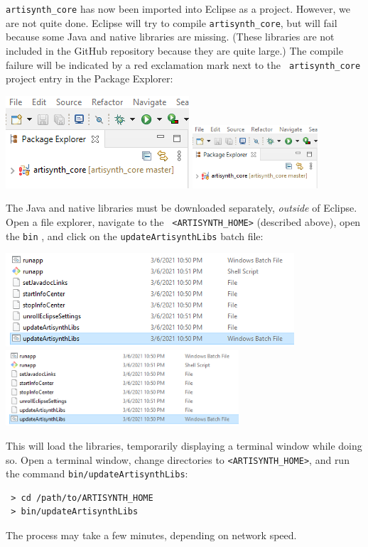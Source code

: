 {\tt artisynth\_core} has now been imported into Eclipse as a
project. However, we are not quite done. Eclipse will try to compile
{\tt artisynth\_core}, but will fail because some Java and native
libraries are missing. (These libraries are not included in the
GitHub repository because they are quite large.) The compile failure
will be indicated by a red exclamation mark next to the {\tt
artisynth\_core} project entry in the Package Explorer:
%
\begin{center}
\iflatexml
   \includegraphics[]{images/artisynthBuildError}
\else
   \includegraphics[width=0.35\textwidth]{images/artisynthBuildError}
\fi
\end{center}
%
The Java and native libraries must be downloaded separately, {\it
outside} of Eclipse.  
\ifWindows
Open a file explorer, navigate to the {\tt
<ARTISYNTH\_HOME>} \directory{}(described above), open the {\tt bin}
\directory{}, and click on the {\tt updateArtisynthLibs} batch file:
\begin{center}
\iflatexml
   \includegraphics[]{images/UpdateArtisynthLibs}
\else
   \includegraphics[width=0.65\textwidth]{images/UpdateArtisynthLibs}
\fi
\end{center}
This will load the libraries, temporarily displaying a terminal window
while doing so.
\fi
\ifMacOS
Open a terminal window, change directories to {\tt <ARTISYNTH\_HOME>},
and run the command {\tt bin/updateArtisynthLibs}:
\begin{verbatim}
 > cd /path/to/ARTISYNTH_HOME
 > bin/updateArtisynthLibs
\end{verbatim}
\fi
The process may take a few minutes, depending on network speed.

